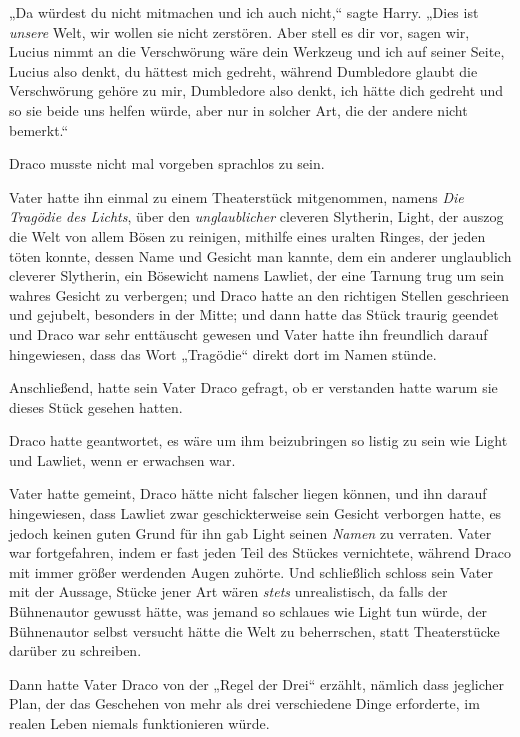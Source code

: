 {„Da würdest du nicht mitmachen und ich auch nicht,“ sagte Harry. „Dies ist \emph{unsere} Welt, wir wollen sie nicht zerstören. Aber stell es dir vor, sagen wir, Lucius nimmt an die Verschwörung wäre dein Werkzeug und ich auf seiner Seite, Lucius also denkt, du hättest mich gedreht, während Dumbledore glaubt die Verschwörung gehöre zu mir, Dumbledore also denkt, ich hätte dich gedreht und so sie beide uns helfen würde, aber nur in solcher Art, die der andere nicht bemerkt.“

Draco musste nicht mal vorgeben sprachlos zu sein.

Vater hatte ihn einmal zu einem Theaterstück mitgenommen, namens \emph{Die Tragödie des Lichts}, über den \emph{unglaublicher} cleveren Slytherin, Light, der auszog die Welt von allem Bösen zu reinigen, mithilfe eines uralten Ringes, der jeden töten konnte, dessen Name und Gesicht man kannte, dem ein anderer unglaublich cleverer Slytherin, ein Bösewicht namens Lawliet, der eine Tarnung trug um sein wahres Gesicht zu verbergen; und Draco hatte an den richtigen Stellen geschrieen und gejubelt, besonders in der Mitte; und dann hatte das Stück traurig geendet und Draco war sehr enttäuscht gewesen und Vater hatte ihn freundlich darauf hingewiesen, dass das Wort „Tragödie“ direkt dort im Namen stünde.

Anschließend, hatte sein Vater Draco gefragt, ob er verstanden hatte warum sie dieses Stück gesehen hatten.

Draco hatte geantwortet, es wäre um ihm beizubringen so listig zu sein wie Light und Lawliet, wenn er erwachsen war.

Vater hatte gemeint, Draco hätte nicht falscher liegen können, und ihn darauf hingewiesen, dass Lawliet zwar geschickterweise sein Gesicht verborgen hatte, es jedoch keinen guten Grund für ihn gab Light seinen \emph{Namen} zu verraten. Vater war fortgefahren, indem er fast jeden Teil des Stückes vernichtete, während Draco mit immer größer werdenden Augen zuhörte. Und schließlich schloss sein Vater mit der Aussage, Stücke jener Art wären \emph{stets} unrealistisch, da falls der Bühnenautor gewusst hätte, was jemand so schlaues wie Light tun würde, der Bühnenautor selbst versucht hätte die Welt zu beherrschen, statt Theaterstücke darüber zu schreiben.

Dann hatte Vater Draco von der „Regel der Drei“ erzählt, nämlich dass jeglicher Plan, der das Geschehen von mehr als drei verschiedene Dinge erforderte, im realen Leben niemals funktionieren würde.

}
